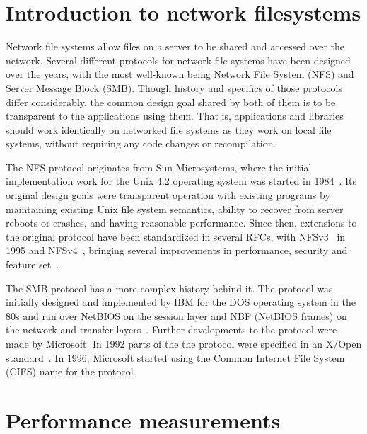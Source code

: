 \section{Introduction to network filesystems}

Network file systems allow files on a server to be shared and accessed over the network.
Several different protocols for network file systems have been designed over the years,
with the most well-known being Network File System (NFS) and 
Server Message Block (SMB).
Though history and specifics of those protocols differ considerably, the common design
goal shared by both of them is to be transparent to the applications using them.
That is, applications and libraries should work identically on networked file systems
as they work on local file systems, without requiring any code changes or recompilation.

The NFS protocol originates from Sun Microsystems, where the initial implementation work for the
Unix 4.2 operating system was started in 1984~\cite{NFS}. Its original design goals were
transparent operation with existing programs by maintaining existing Unix file system
semantics, ability to recover from server reboots or crashes, and having reasonable
performance. Since then, extensions to the original protocol have been standardized
in several RFCs, with NFSv3~\cite{NFSv3RFC} in 1995 and NFSv4~\cite{NFSv4RFC},
bringing several improvements in performance, security and feature set~\cite{NFSv4Better}.

The SMB protocol has a more complex history behind it. The protocol was initially designed
and implemented by IBM for the DOS operating system in the 80s
and ran over NetBIOS on the session layer and NBF (NetBIOS frames) on the network and transfer layers~\cite{CifsBook}.
Further developments to the protocol were made by Microsoft.
In 1992 parts of the the protocol were specified in an X/Open standard~\cite{XopenSmbSpec}.
In 1996, Microsoft started using the Common Internet File System (CIFS) name for the protocol.

\section{Performance measurements}

